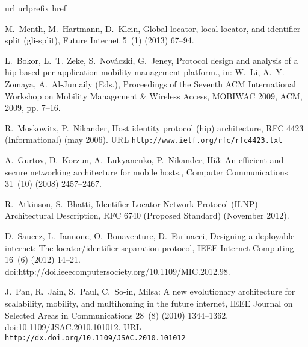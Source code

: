 \documentclass[preprint,12pt]{elsarticle}
\begin{document}
\begin{thebibliography}{10}
\expandafter\ifx\csname url\endcsname\relax
  \def\url#1{\texttt{#1}}\fi
\expandafter\ifx\csname urlprefix\endcsname\relax\def\urlprefix{URL }\fi
\expandafter\ifx\csname href\endcsname\relax
  \def\href#1#2{#2} \def\path#1{#1}\fi

M.~Menth, M.~Hartmann, D.~Klein, Global locator, local locator, and identifier
  split (gli-split), Future Internet 5~(1) (2013) 67--94.

L.~Bokor, L.~T. Zeke, S.~Nováczki, G.~Jeney, Protocol design and analysis of a
  hip-based per-application mobility management platform., in: W.~Li, A.~Y.
  Zomaya, A.~Al-Jumaily (Eds.), Proceedings of the Seventh ACM International
  Workshop on Mobility Management {\&} Wireless Access, MOBIWAC 2009, ACM,
  2009, pp. 7--16.

R.~Moskowitz, P.~Nikander, \href{http://www.ietf.org/rfc/rfc4423.txt}{Host
  identity protocol (hip) architecture}, RFC 4423 (Informational) (may 2006).
\newline\urlprefix\url{http://www.ietf.org/rfc/rfc4423.txt}

A.~Gurtov, D.~Korzun, A.~Lukyanenko, P.~Nikander, Hi3: An efficient and secure
  networking architecture for mobile hosts., Computer Communications 31~(10)
  (2008) 2457--2467.

R.~Atkinson, S.~Bhatti, {Identifier-Locator Network Protocol (ILNP)
  Architectural Description}, RFC 6740 (Proposed Standard) (November 2012).

D.~Saucez, L.~Iannone, O.~Bonaventure, D.~Farinacci, Designing a deployable
  internet: The locator/identifier separation protocol, IEEE Internet Computing
  16~(6) (2012) 14--21.
\newblock \href
  {http://dx.doi.org/http://doi.ieeecomputersociety.org/10.1109/MIC.2012.98}
  {\path{doi:http://doi.ieeecomputersociety.org/10.1109/MIC.2012.98}}.

J.~Pan, R.~Jain, S.~Paul, C.~So-in,
  \href{http://dx.doi.org/10.1109/JSAC.2010.101012}{Milsa: A new evolutionary
  architecture for scalability, mobility, and multihoming in the future
  internet}, IEEE Journal on Selected Areas in Communications 28~(8) (2010)
  1344--1362.
\newblock \href {http://dx.doi.org/10.1109/JSAC.2010.101012}
  {\path{doi:10.1109/JSAC.2010.101012}}.
\newline\urlprefix\url{http://dx.doi.org/10.1109/JSAC.2010.101012}


\end{thebibliography}
\end{document}
